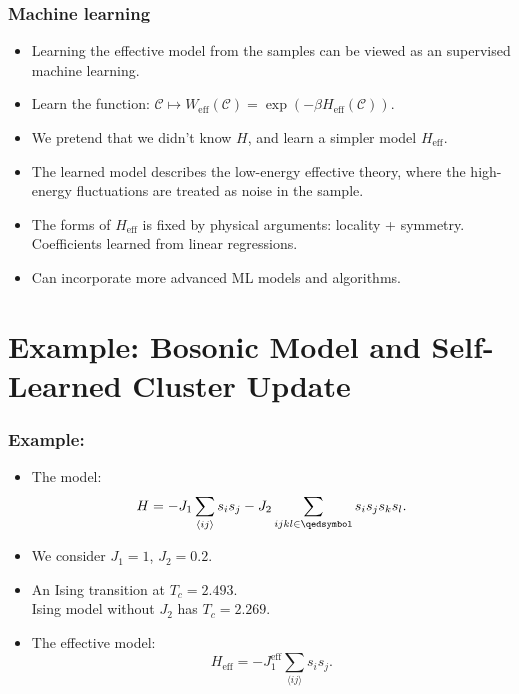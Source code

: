 \documentclass[xcolor=table, 10pt, aspectratio=169]{beamer}
\begin{document}
\begin{frame}
  \frametitle{Machine learning}
  \begin{itemize}
    \item Learning the effective model from the samples can be viewed as an supervised machine learning.
		\item Learn the function: $\mathcal C\mapsto W_{\text{eff}}(\mathcal C)=\exp(-\beta H_{\text{eff}}(\mathcal C))$.
    \item We pretend that we didn't know $H$, and learn a simpler model $H_{\text{eff}}$.
    \item The learned model describes the low-energy effective theory, where the high-energy fluctuations are treated as noise in the sample.
		\item The forms of $H_{\text{eff}}$ is fixed by physical arguments: locality + symmetry. Coefficients learned from linear regressions.
    \item Can incorporate more advanced ML models and algorithms.
  \end{itemize}
\end{frame}


\section{Example: Bosonic Model and Self-Learned Cluster Update}

\begin{frame}
  \frametitle{Example:}
  \begin{itemize}
    \item The model:
    \[H= - J_1 \sum_{\langle ij\rangle} s_i s_j - J_2 \sum_{ijkl \in \qedsymbol } s_i s_j s_k s_l.\]
    \item We consider $J_1=1$, $J_2=0.2$.
    \item An Ising transition at $T_c=2.493$.\\
    {\small Ising model without $J_2$ has $T_c=2.269$.}
		\item The effective model:
    \[H_{\text{eff}} = -J_1^{\text{eff}}\sum_{\langle ij\rangle} s_i s_j.\]
  \end{itemize}
\end{frame}
\end{document}

